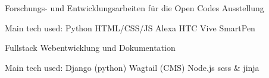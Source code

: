 \documentclass[a4paper]{deedy-resume_twopage} %
\begin{document}
\begin{minipage}[t]{0.66\textwidth}
  \sectionspace %



  \begin{tightitemize}
  \item Forschungs- und Entwicklungsarbeiten für die Open Codes Ausstellung
  \end{tightitemize}
  Main tech used: \textbullet{} Python \textbullet{} HTML/CSS/JS \textbullet{} Alexa \textbullet{} HTC Vive \textbullet{} SmartPen

  \sectionspace %



  \begin{tightitemize}
  \item Fullstack Webentwicklung und Dokumentation
  \end{tightitemize}
  Main tech used: \textbullet{} Django (python) \textbullet{} Wagtail (CMS) \textbullet{} Node.js \textbullet{} scss \& jinja

  \sectionspace %




\end{minipage}
\end{document}
